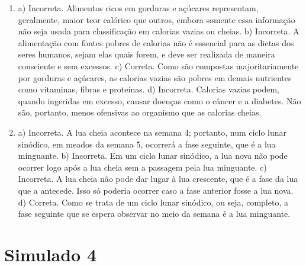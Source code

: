 \begin{enumerate}
\item
a) Incorreta. Alimentos ricos em gorduras e açúcares representam,
geralmente, maior teor calórico que outros, embora somente essa
informação não seja usada para classificação em calorias vazias ou
cheias.
b) Incorreta. A alimentação com fontes pobres de calorias não é
essencial para as dietas dos seres humanos, sejam elas quais forem, e
deve ser realizada de maneira consciente e sem excessos.
c) Correta. Como são compostas majoritariamente por gorduras e açúcares,
as calorias vazias são pobres em demais nutrientes como vitaminas,
fibras e proteínas.
d) Incorreta. Calorias vazias podem, quando ingeridas em excesso, causar
doenças como o câncer e a diabetes. Não são, portanto, menos ofensivas
ao organismo que as calorias cheias.

\item
a) Incorreta. A lua cheia acontece na semana 4; portanto, num ciclo
lunar sinódico, em meados da semana 5, ocorrerá a fase seguinte, que é a
lua minguante.
b) Incorreta. Em um ciclo lunar sinódico, a lua nova não pode ocorrer
logo após a lua cheia sem a passagem pela lua minguante.
c) Incorreta. A lua cheia não pode dar lugar à lua crescente, que é a
fase da lua que a antecede. Isso só poderia ocorrer caso a fase anterior
fosse a lua nova.
d) Correta. Como se trata de um ciclo lunar sinódico, ou seja, completo,
a fase seguinte que se espera observar no meio da semana é a lua
minguante.
\end{enumerate}

\chapter{Simulado 4}

